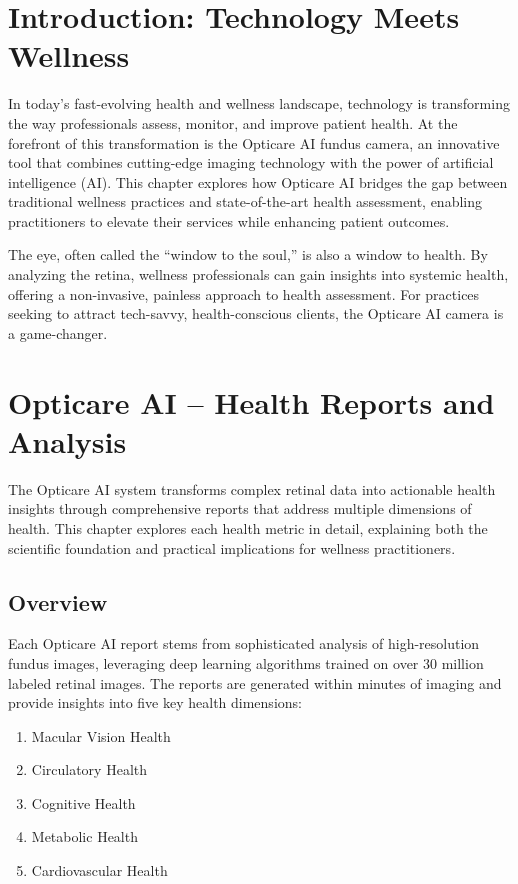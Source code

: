 \documentclass[
  Letterpaper,
]{scrbook}
\providecommand{\tightlist}{%
  \setlength{\itemsep}{0pt}\setlength{\parskip}{0pt}}\usepackage{longtable,booktabs,array}
\begin{document}
\section{Introduction: Technology Meets
Wellness}\label{introduction-technology-meets-wellness}

In today's fast-evolving health and wellness landscape, technology is
transforming the way professionals assess, monitor, and improve patient
health. At the forefront of this transformation is the Opticare AI
fundus camera, an innovative tool that combines cutting-edge imaging
technology with the power of artificial intelligence (AI). This chapter
explores how Opticare AI bridges the gap between traditional wellness
practices and state-of-the-art health assessment, enabling practitioners
to elevate their services while enhancing patient outcomes.

The eye, often called the ``window to the soul,'' is also a window to
health. By analyzing the retina, wellness professionals can gain
insights into systemic health, offering a non-invasive, painless
approach to health assessment. For practices seeking to attract
tech-savvy, health-conscious clients, the Opticare AI camera is a
game-changer.

\section{Opticare AI -- Health Reports and
Analysis}\label{opticare-ai-health-reports-and-analysis}

The Opticare AI system transforms complex retinal data into actionable
health insights through comprehensive reports that address multiple
dimensions of health. This chapter explores each health metric in
detail, explaining both the scientific foundation and practical
implications for wellness practitioners.

\subsection{Overview}\label{overview}

Each Opticare AI report stems from sophisticated analysis of
high-resolution fundus images, leveraging deep learning algorithms
trained on over 30 million labeled retinal images. The reports are
generated within minutes of imaging and provide insights into five key
health dimensions:

\begin{enumerate}
\def\labelenumi{\arabic{enumi}.}
\tightlist
\item
  Macular Vision Health
\item
  Circulatory Health
\item
  Cognitive Health
\item
  Metabolic Health
\item
  Cardiovascular Health
\end{enumerate}
\end{document}
